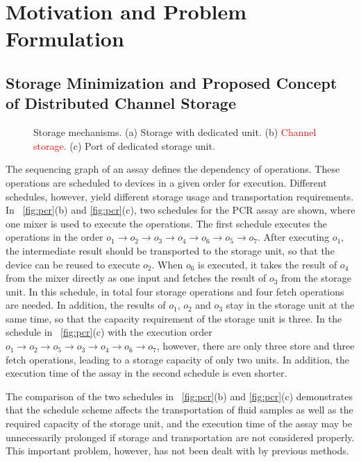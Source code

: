 
\section{Motivation and Problem Formulation}\label{sec:motivation}

\subsection{Storage Minimization and Proposed Concept of Distributed Channel Storage}

\begin{figure}[t]
{\figurefontsize
\centering

\caption{Storage mechanisms. (a) Storage with dedicated unit. (b) \textcolor{red}{Channel
storage.} (c) Port of dedicated storage unit.}
\label{fig:device_storage}
}
\end{figure}

The sequencing graph of an assay defines the dependency of operations. These
operations are scheduled to devices in a given order for execution. Different
schedules, however, yield different storage usage and transportation
requirements.
%
In \figname~\ref{fig:pcr}(b) and \ref{fig:pcr}(c), two schedules
for the PCR assay are shown, where one mixer is used to execute the
operations. The first schedule executes the operations in the order
$o_1\to o_2\to o_3 \to o_4 \to o_6 \to o_5\to o_7$. After executing $o_1$, the
intermediate result should be transported to the storage unit, so that the device
can be reused to execute $o_2$. When $o_6$ is executed, it takes the result of
$o_4$ from the mixer directly as one input and fetches the result of $o_3$
from the storage unit. In this schedule, in total four storage operations
and four fetch operations are needed. In addition, the results of $o_1$,
$o_2$ and $o_3$ stay in the storage unit at the same time, so that the
capacity requirement of the storage unit is three.
In the schedule in \figname~\ref{fig:pcr}(c) with the execution order
$o_1\to o_2\to o_5 \to o_3 \to o_4 \to o_6\to o_7$,
however, there are only three store and three fetch operations,
leading to a storage capacity of only two units.
In addition, the execution
time of the assay in the second schedule is even shorter.

The comparison of the two schedules in \figname~\ref{fig:pcr}(b) and
\ref{fig:pcr}(c) demonstrates that the schedule scheme affects the
transportation of fluid samples as well as the required capacity of the storage unit,
and the execution time of the assay may be unnecessarily prolonged if storage
and transportation are not considered properly.
This important problem, however, has not been dealt with by previous
methods.



